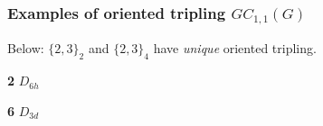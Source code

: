 \documentclass{beamer}
\begin{document}
\begin{frame}\frametitle{Examples of oriented tripling $GC_{1,1}(G)$} 
\vspace{-3mm}
Below: $\{2,3\}_2$ and $\{2,3\}_4$ have {\em unique} oriented tripling.
\begin{center}
\begin{minipage}[b]{24mm}\centering
{}\par
{\bf 2} $D_{6h}$\end{minipage}
\begin{minipage}[b]{22mm}\centering
{}\par
{\bf 6} $D_{3d}$\end{minipage}

\end{center}
\end{frame}
\end{document}
